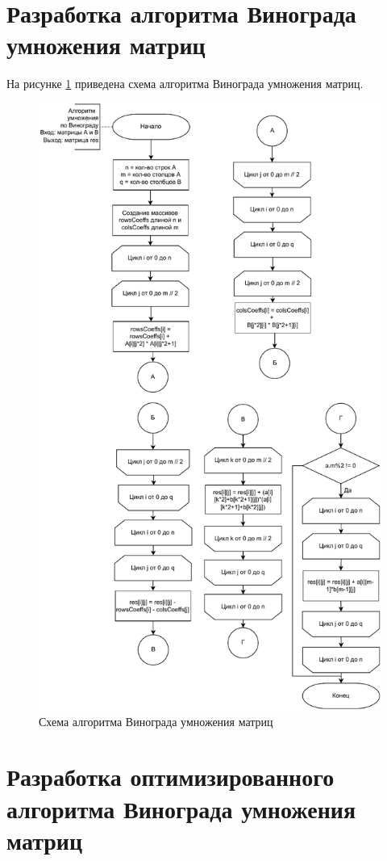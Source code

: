 \section{Разработка алгоритма Винограда умножения матриц}
На рисунке \ref{img:grape} приведена схема алгоритма Винограда умножения матриц.
\begin{figure}[h]
	\centering
	\includegraphics[width=130mm]{images/grape}
	\caption{Схема алгоритма Винограда умножения матриц}
	\label{img:grape}
\end{figure}
\clearpage
\section{Разработка оптимизированного алгоритма Винограда умножения матриц}

